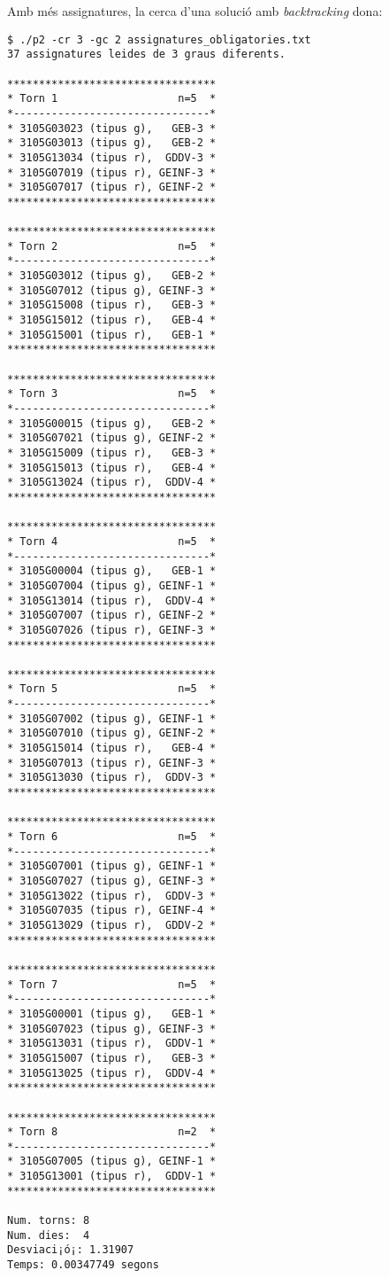 \documentclass[10pt,a4paper]{../documents/class_material_assignatura_udg}
\begin{document}
Amb més assignatures, la cerca d'una solució amb \textit{backtracking} dona:
\begin{lstlisting}[style=codibash]
$ ./p2 -cr 3 -gc 2 assignatures_obligatories.txt
37 assignatures leides de 3 graus diferents.

*********************************
* Torn 1                   n=5  *
*-------------------------------*
* 3105G03023 (tipus g),   GEB-3 *
* 3105G03013 (tipus g),   GEB-2 *
* 3105G13034 (tipus r),  GDDV-3 *
* 3105G07019 (tipus r), GEINF-3 *
* 3105G07017 (tipus r), GEINF-2 *
*********************************

*********************************
* Torn 2                   n=5  *
*-------------------------------*
* 3105G03012 (tipus g),   GEB-2 *
* 3105G07012 (tipus g), GEINF-3 *
* 3105G15008 (tipus r),   GEB-3 *
* 3105G15012 (tipus r),   GEB-4 *
* 3105G15001 (tipus r),   GEB-1 *
*********************************

*********************************
* Torn 3                   n=5  *
*-------------------------------*
* 3105G00015 (tipus g),   GEB-2 *
* 3105G07021 (tipus g), GEINF-2 *
* 3105G15009 (tipus r),   GEB-3 *
* 3105G15013 (tipus r),   GEB-4 *
* 3105G13024 (tipus r),  GDDV-4 *
*********************************

*********************************
* Torn 4                   n=5  *
*-------------------------------*
* 3105G00004 (tipus g),   GEB-1 *
* 3105G07004 (tipus g), GEINF-1 *
* 3105G13014 (tipus r),  GDDV-4 *
* 3105G07007 (tipus r), GEINF-2 *
* 3105G07026 (tipus r), GEINF-3 *
*********************************

*********************************
* Torn 5                   n=5  *
*-------------------------------*
* 3105G07002 (tipus g), GEINF-1 *
* 3105G07010 (tipus g), GEINF-2 *
* 3105G15014 (tipus r),   GEB-4 *
* 3105G07013 (tipus r), GEINF-3 *
* 3105G13030 (tipus r),  GDDV-3 *
*********************************

*********************************
* Torn 6                   n=5  *
*-------------------------------*
* 3105G07001 (tipus g), GEINF-1 *
* 3105G07027 (tipus g), GEINF-3 *
* 3105G13022 (tipus r),  GDDV-3 *
* 3105G07035 (tipus r), GEINF-4 *
* 3105G13029 (tipus r),  GDDV-2 *
*********************************

*********************************
* Torn 7                   n=5  *
*-------------------------------*
* 3105G00001 (tipus g),   GEB-1 *
* 3105G07023 (tipus g), GEINF-3 *
* 3105G13031 (tipus r),  GDDV-1 *
* 3105G15007 (tipus r),   GEB-3 *
* 3105G13025 (tipus r),  GDDV-4 *
*********************************

*********************************
* Torn 8                   n=2  *
*-------------------------------*
* 3105G07005 (tipus g), GEINF-1 *
* 3105G13001 (tipus r),  GDDV-1 *
*********************************

Num. torns: 8
Num. dies:  4
Desviaci¡ó¡: 1.31907
Temps: 0.00347749 segons
\end{lstlisting}
\end{document}
